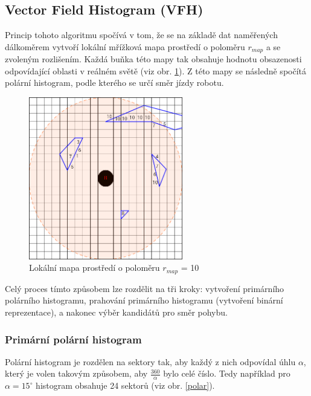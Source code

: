 \documentclass[twoside]{ctuthesis}
\theoremstyle{plain}
\theoremstyle{definition}
\theoremstyle{note}
\begin{document}
\subsection{Vector Field Histogram (VFH)}




Princip tohoto algoritmu spočívá v tom, že se na základě dat naměřených dálkoměrem vytvoří lokální mřížková mapa prostředí o poloměru $r_{map}$ a se zvoleným rozlišením. Každá buňka této mapy tak obsahuje hodnotu obsazenosti odpovídající oblasti v reálném světě (viz obr. \ref{mrizka}). Z této mapy se následně spočítá polární histogram, podle kterého se určí směr jízdy robotu.

\begin{figure}[H]
	\caption{Lokální mapa prostředí o poloměru $r_{map}$ = 10}

	\label{mrizka}
	\includegraphics[width=0.6\textwidth, height = 0.6\textwidth]{images/3/mrizka.png}
\end{figure}

Celý proces tímto způsobem lze rozdělit na tři kroky: vytvoření primárního polárního histogramu, prahování primárního histogramu (vytvoření binární reprezentace), a nakonec výběr kandidátů pro směr pohybu.

\subsubsection{Primární polární histogram}

Polární histogram je rozdělen na sektory tak, aby každý z nich odpovídal úhlu $\alpha$, který je volen takovým způsobem, aby $\frac{360}{\alpha}$ bylo celé číslo. Tedy například pro $\alpha = 15^{\circ}$ histogram obsahuje 24 sektorů (viz obr. \ref{polar}).
\end{document}
